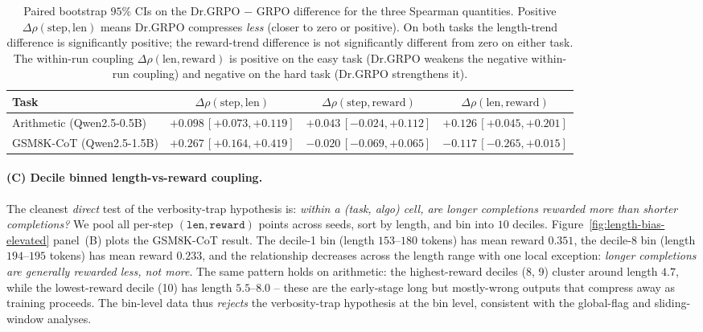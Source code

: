 \documentclass{article}
\begin{document}
\begin{table}[htbp]
\centering
\small
\begin{tabular}{lccc}
\toprule
Task & $\Delta\rho(\text{step},\text{len})$
   & $\Delta\rho(\text{step},\text{reward})$
   & $\Delta\rho(\text{len},\text{reward})$ \\
\midrule
Arithmetic (Qwen2.5-0.5B)   & $+0.098\,[+0.073,+0.119]$ & $+0.043\,[-0.024,+0.112]$ & $+0.126\,[+0.045,+0.201]$ \\
GSM8K-CoT (Qwen2.5-1.5B)    & $+0.267\,[+0.164,+0.419]$ & $-0.020\,[-0.069,+0.065]$ & $-0.117\,[-0.265,+0.015]$ \\
\bottomrule
\end{tabular}
\caption{Paired bootstrap $95\%$ CIs on the Dr.GRPO $-$ GRPO
difference for the three Spearman quantities. Positive
$\Delta\rho(\text{step},\text{len})$ means Dr.GRPO compresses
\emph{less} (closer to zero or positive). On both tasks the
length-trend difference is significantly positive; the
reward-trend difference is not significantly different from zero
on either task. The within-run coupling
$\Delta\rho(\text{len},\text{reward})$ is positive on the easy
task (Dr.GRPO weakens the negative within-run coupling) and
negative on the hard task (Dr.GRPO strengthens it).}
\label{tab:length-bias-ci}
\end{table}

\paragraph{(C) Decile binned length-vs-reward coupling.}
The cleanest \emph{direct} test of the verbosity-trap hypothesis
is: \emph{within a (task, algo) cell, are longer completions
rewarded more than shorter completions?} We pool all
per-step $(\texttt{len}, \texttt{reward})$ points across seeds,
sort by length, and bin into $10$ deciles. Figure~\ref{fig:length-bias-elevated}
panel~(B) plots the GSM8K-CoT result. The decile-1 bin
(length $153$--$180$ tokens) has mean reward $0.351$, the
decile-8 bin (length $194$--$195$ tokens) has mean reward
$0.233$, and the relationship decreases across the length range with
one local exception: \emph{longer
completions are generally rewarded \emph{less}, not more}. The same
pattern holds on arithmetic: the highest-reward deciles (8, 9)
cluster around length $4.7$, while the lowest-reward decile
(10) has length $5.5$--$8.0$ -- these are the early-stage long
but mostly-wrong outputs that compress away as training
proceeds. The bin-level data thus \emph{rejects} the
verbosity-trap hypothesis at the bin level, consistent with the
global-flag and sliding-window analyses.
\end{document}
